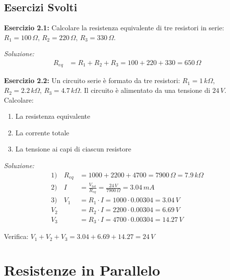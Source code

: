 \documentclass[a4paper,12pt]{article}
\begin{document}
\subsection{Esercizi Svolti}

\textbf{Esercizio 2.1:} Calcolare la resistenza equivalente di tre resistori in serie: $R_1 = 100\,\Omega$, $R_2 = 220\,\Omega$, $R_3 = 330\,\Omega$.

\textit{Soluzione:}
\begin{align*}
R_{eq} &= R_1 + R_2 + R_3 = 100 + 220 + 330 = 650\,\Omega
\end{align*}

\textbf{Esercizio 2.2:} Un circuito serie è formato da tre resistori: $R_1 = 1\,k\Omega$, $R_2 = 2.2\,k\Omega$, $R_3 = 4.7\,k\Omega$. Il circuito è alimentato da una tensione di $24\,V$. Calcolare:
\begin{enumerate}
    \item La resistenza equivalente
    \item La corrente totale
    \item La tensione ai capi di ciascun resistore
\end{enumerate}

\textit{Soluzione:}
\begin{align*}
1)\quad R_{eq} &= 1000 + 2200 + 4700 = 7900\,\Omega = 7.9\,k\Omega \\
2)\quad I &= \frac{V_{tot}}{R_{eq}} = \frac{24\,V}{7900\,\Omega} = 3.04\,mA \\
3)\quad V_1 &= R_1 \cdot I = 1000 \cdot 0.00304 = 3.04\,V \\
V_2 &= R_2 \cdot I = 2200 \cdot 0.00304 = 6.69\,V \\
V_3 &= R_3 \cdot I = 4700 \cdot 0.00304 = 14.27\,V
\end{align*}

Verifica: $V_1 + V_2 + V_3 = 3.04 + 6.69 + 14.27 = 24\,V$ \checkmark

\newpage
\section{Resistenze in Parallelo}
\end{document}
